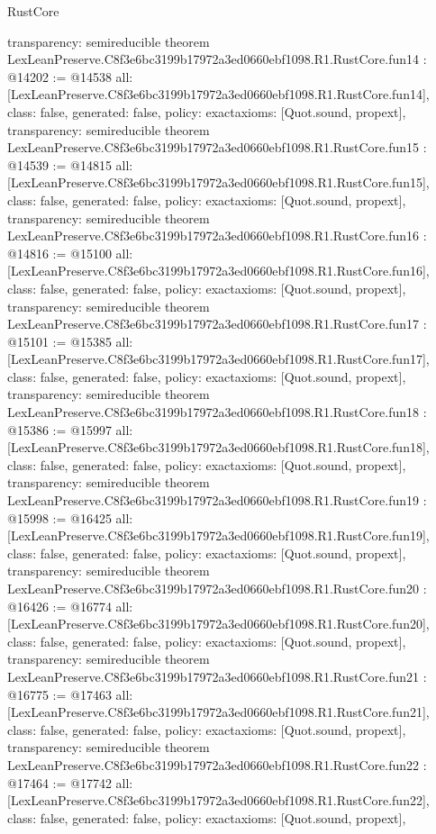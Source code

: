 \begin{lexlean}{RustCore}
\begin{coremodule}
{  transparency: semireducible
}
theorem LexLeanPreserve.C8f3e6bc3199b17972a3ed0660ebf1098.R1.RustCore.fun14 : @14202 := @14538 {
  all: [LexLeanPreserve.C8f3e6bc3199b17972a3ed0660ebf1098.R1.RustCore.fun14],
  class: false,
  generated: false,
  policy: exact{axioms: [Quot.sound, propext]},
  transparency: semireducible
}
theorem LexLeanPreserve.C8f3e6bc3199b17972a3ed0660ebf1098.R1.RustCore.fun15 : @14539 := @14815 {
  all: [LexLeanPreserve.C8f3e6bc3199b17972a3ed0660ebf1098.R1.RustCore.fun15],
  class: false,
  generated: false,
  policy: exact{axioms: [Quot.sound, propext]},
  transparency: semireducible
}
theorem LexLeanPreserve.C8f3e6bc3199b17972a3ed0660ebf1098.R1.RustCore.fun16 : @14816 := @15100 {
  all: [LexLeanPreserve.C8f3e6bc3199b17972a3ed0660ebf1098.R1.RustCore.fun16],
  class: false,
  generated: false,
  policy: exact{axioms: [Quot.sound, propext]},
  transparency: semireducible
}
theorem LexLeanPreserve.C8f3e6bc3199b17972a3ed0660ebf1098.R1.RustCore.fun17 : @15101 := @15385 {
  all: [LexLeanPreserve.C8f3e6bc3199b17972a3ed0660ebf1098.R1.RustCore.fun17],
  class: false,
  generated: false,
  policy: exact{axioms: [Quot.sound, propext]},
  transparency: semireducible
}
theorem LexLeanPreserve.C8f3e6bc3199b17972a3ed0660ebf1098.R1.RustCore.fun18 : @15386 := @15997 {
  all: [LexLeanPreserve.C8f3e6bc3199b17972a3ed0660ebf1098.R1.RustCore.fun18],
  class: false,
  generated: false,
  policy: exact{axioms: [Quot.sound, propext]},
  transparency: semireducible
}
theorem LexLeanPreserve.C8f3e6bc3199b17972a3ed0660ebf1098.R1.RustCore.fun19 : @15998 := @16425 {
  all: [LexLeanPreserve.C8f3e6bc3199b17972a3ed0660ebf1098.R1.RustCore.fun19],
  class: false,
  generated: false,
  policy: exact{axioms: [Quot.sound, propext]},
  transparency: semireducible
}
theorem LexLeanPreserve.C8f3e6bc3199b17972a3ed0660ebf1098.R1.RustCore.fun20 : @16426 := @16774 {
  all: [LexLeanPreserve.C8f3e6bc3199b17972a3ed0660ebf1098.R1.RustCore.fun20],
  class: false,
  generated: false,
  policy: exact{axioms: [Quot.sound, propext]},
  transparency: semireducible
}
theorem LexLeanPreserve.C8f3e6bc3199b17972a3ed0660ebf1098.R1.RustCore.fun21 : @16775 := @17463 {
  all: [LexLeanPreserve.C8f3e6bc3199b17972a3ed0660ebf1098.R1.RustCore.fun21],
  class: false,
  generated: false,
  policy: exact{axioms: [Quot.sound, propext]},
  transparency: semireducible
}
theorem LexLeanPreserve.C8f3e6bc3199b17972a3ed0660ebf1098.R1.RustCore.fun22 : @17464 := @17742 {
  all: [LexLeanPreserve.C8f3e6bc3199b17972a3ed0660ebf1098.R1.RustCore.fun22],
  class: false,
  generated: false,
  policy: exact{axioms: [Quot.sound, propext]},
}
\end{coremodule}
\end{lexlean}
